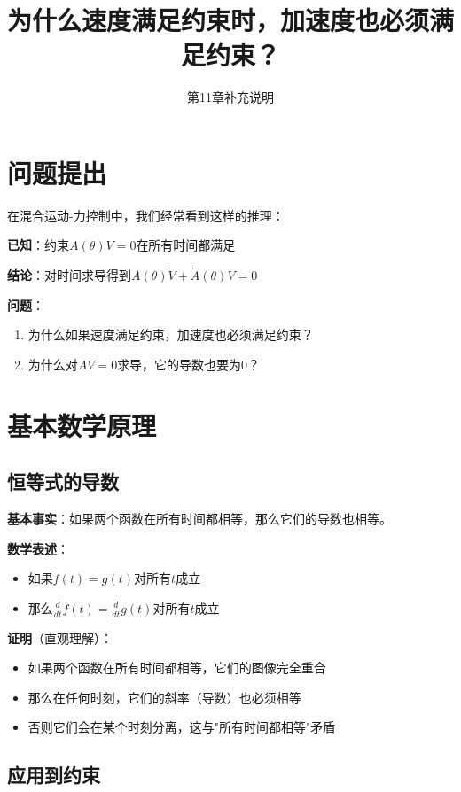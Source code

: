 \documentclass[12pt,a4paper]{article}
\title{为什么速度满足约束时，加速度也必须满足约束？}
\author{第11章补充说明}
\date{}
\begin{document}
\maketitle

\section{问题提出}

在混合运动-力控制中，我们经常看到这样的推理：

\textbf{已知}：约束$A(\theta)V = 0$在所有时间都满足

\textbf{结论}：对时间求导得到$A(\theta)\dot{V} + \dot{A}(\theta)V = 0$

\textbf{问题}：
\begin{enumerate}
\item 为什么如果速度满足约束，加速度也必须满足约束？
\item 为什么对$AV = 0$求导，它的导数也要为0？
\end{enumerate}

\section{基本数学原理}

\subsection{恒等式的导数}

\textbf{基本事实}：如果两个函数在所有时间都相等，那么它们的导数也相等。

\textbf{数学表述}：
\begin{itemize}
\item 如果$f(t) = g(t)$对所有$t$成立
\item 那么$\frac{d}{dt}f(t) = \frac{d}{dt}g(t)$对所有$t$成立
\end{itemize}

\textbf{证明}（直观理解）：
\begin{itemize}
\item 如果两个函数在所有时间都相等，它们的图像完全重合
\item 那么在任何时刻，它们的斜率（导数）也必须相等
\item 否则它们会在某个时刻分离，这与"所有时间都相等"矛盾
\end{itemize}

\subsection{应用到约束}
\end{document}
